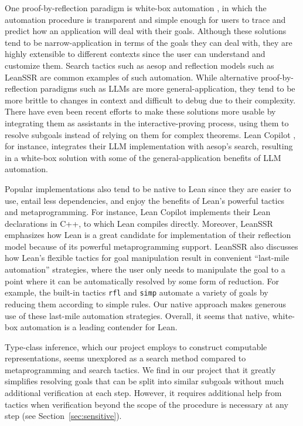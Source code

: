 One proof-by-reflection paradigm is white-box automation \cite{Aesop2023}, in which the automation procedure is transparent and simple enough for users to trace and predict how an application will deal with their goals. Although these solutions tend to be narrow-application in terms of the goals they can deal with, they are highly extensible to different contexts since the user can understand and customize them. Search tactics such as aesop \cite{Aesop2023} and reflection models such as LeanSSR \cite{SmallScaleReflection2024} are common examples of such automation. While alternative proof-by-reflection paradigms such as LLMs are more general-application, they tend to be more brittle to changes in context and difficult to debug due to their complexity. There have even been recent efforts to make these solutions more usable by integrating them as assistants in the interactive-proving process, using them to resolve subgoals instead of relying on them for complex theorems. Lean Copilot \cite{LeanCopilot2025}, for instance, integrates their LLM implementation with aesop’s search, resulting in a white-box solution with some of the general-application benefits of LLM automation.

Popular implementations also tend to be native to Lean since they are easier to use, entail less dependencies, and enjoy the benefits of Lean's powerful tactics and metaprogramming. For instance, Lean Copilot \cite{LeanCopilot2025} implements their Lean declarations in C++, to which Lean compiles directly. Moreover, LeanSSR \cite{SmallScaleReflection2024} emphasizes how Lean is a great candidate for implementation of their reflection model because of its powerful metaprogramming support. LeanSSR also discusses how Lean's flexible tactics for goal manipulation result in convenient ``last-mile automation'' strategies, where the user only needs to manipulate the goal to a point where it can be automatically resolved by some form of reduction. For example, the built-in tactics \lstinline{rfl} and \lstinline{simp} automate a variety of goals by reducing them according to simple rules. Our native approach makes generous use of these last-mile automation strategies. Overall, it seems that native, white-box automation is a leading contender for Lean.

Type-class inference, which our project employs to construct computable representations, seems unexplored as a search method compared to metaprogramming and search tactics. We find in our project that it greatly simplifies resolving goals that can be split into similar subgoals without much additional verification at each step. However, it requires additional help from tactics when verification beyond the scope of the procedure is necessary at any step (see Section~\ref{sec:sensitive}).

